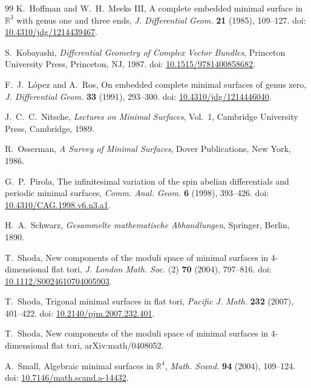 \documentclass[12pt]{article}
\numberwithin{equation}{section}
\theoremstyle{definition}
\theoremstyle{remark}
\begin{document}
\begin{thebibliography}{99}
K.~Hoffman and W.~H.~Meeks III,
A complete embedded minimal surface in $\mathbb{R}^3$ with genus one and three ends,
\textit{J. Differential Geom.} \textbf{21} (1985), 109--127.
doi: \href{https://doi.org/10.4310/jdg/1214439467}{10.4310/jdg/1214439467}.

S.~Kobayashi,
\textit{Differential Geometry of Complex Vector Bundles},
Princeton University Press, Princeton, NJ, 1987.
doi: \href{https://doi.org/10.1515/9781400858682}{10.1515/9781400858682}.

F.~J.~L\'opez and A.~Ros,
On embedded complete minimal surfaces of genus zero,
\textit{J. Differential Geom.} \textbf{33} (1991), 293--300.
doi: \href{https://doi.org/10.4310/jdg/1214446040}{10.4310/jdg/1214446040}.

J.~C.~C.~Nitsche,
\textit{Lectures on Minimal Surfaces}, Vol.~1,
Cambridge University Press, Cambridge, 1989.

R.~Osserman,
\textit{A Survey of Minimal Surfaces},
Dover Publications, New York, 1986.

G.~P.~Pirola,
The infinitesimal variation of the spin abelian differentials and periodic minimal surfaces,
\textit{Comm. Anal. Geom.} \textbf{6} (1998), 393--426.
doi: \href{https://doi.org/10.4310/CAG.1998.v6.n3.a1}{10.4310/CAG.1998.v6.n3.a1}.

H.~A.~Schwarz,
\textit{Gesammelte mathematische Abhandlungen},
Springer, Berlin, 1890.

T.~Shoda,
New components of the moduli space of minimal surfaces in 4-dimensional flat tori,
\textit{J. London Math. Soc.} (2) \textbf{70} (2004), 797--816.
doi: \href{https://doi.org/10.1112/S0024610704005903}{10.1112/S0024610704005903}.

T.~Shoda,
Trigonal minimal surfaces in flat tori,
\textit{Pacific J. Math.} \textbf{232} (2007), 401--422.
doi: \href{https://doi.org/10.2140/pjm.2007.232.401}{10.2140/pjm.2007.232.401}.

T.~Shoda,
New components of the moduli space of minimal surfaces in 4-dimensional flat tori,
arXiv:math/0408052.

A.~Small,
Algebraic minimal surfaces in $\mathbb{R}^4$,
\textit{Math. Scand.} \textbf{94} (2004), 109--124.
doi: \href{https://doi.org/10.7146/math.scand.a-14432}{10.7146/math.scand.a-14432}.


\end{thebibliography}
\end{document}
